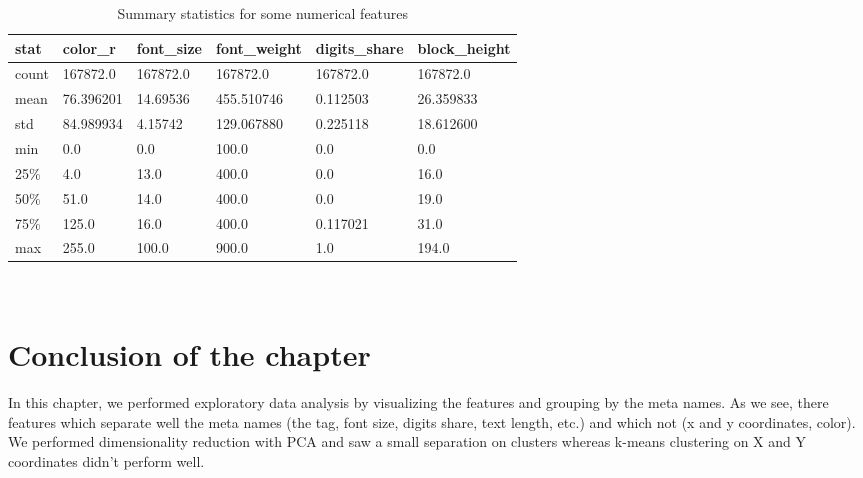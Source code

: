 \begin{table}[h]
\begin{center}
{\renewcommand{\arraystretch}{1.5}
\begin{tabular}{| p{0.8cm} | p{2cm}|  p{2cm}|  p{2.3cm}|  p{2.3cm}|  p{2.4cm}|}
\hline
\textbf{stat}    &    \textbf{color\_r}    &    \textbf{font\_size}    &    \textbf{font\_weight}    &    \textbf{digits\_share}    &    \textbf{block\_height}\\
\hline
count    &    167872.0    &    167872.0    &    167872.0    &    167872.0    &    167872.0\\
\hline
mean    &    76.396201    &    14.69536    &    455.510746    &    0.112503    &    26.359833\\
\hline
std    &    84.989934    &    4.15742    &    129.067880    &    0.225118    &    18.612600\\
\hline
min    &    0.0    &    0.0    &    100.0    &    0.0    &    0.0\\
\hline
25\%    &    4.0    &    13.0    &    400.0    &    0.0    &    16.0\\
\hline
50\%    &    51.0    &    14.0    &    400.0    &    0.0    &    19.0\\
\hline
75\%    &    125.0    &    16.0    &    400.0    &    0.117021    &    31.0\\
\hline
max    &    255.0    &    100.0    &    900.0    &    1.0    &    194.0\\
\hline
\end{tabular}}
\caption{Summary statistics for some numerical features}
\label{table:sumstatnum}
\end{center}
\end{table} \\

 
\section*{Conclusion of the chapter}
In this chapter, we performed exploratory data analysis by visualizing the features and grouping by the meta names. As we see, there features which separate well the meta names (the tag, font size, digits share, text length, etc.) and which not (x and y coordinates, color). We performed dimensionality reduction with PCA and saw a small separation on clusters whereas k-means clustering on X and Y coordinates didn't perform well.  